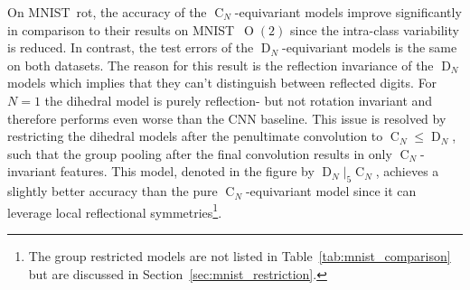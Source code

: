 \documentclass{article}
\renewcommand{\O}[1]{\ensuremath{\operatorname{O}(#1)}}
\newcommand{\DN}{\ensuremath{\operatorname{D}_{\!N}}}
\newcommand{\CN}{\ensuremath{\operatorname{C}_{\!N}}}
\begin{document}
On MNIST~rot, the accuracy of the $\CN$-equivariant models improve significantly in comparison to their results on MNIST~$\O2$ since the intra-class variability is reduced.
In contrast, the test errors of the $\DN$-equivariant models is the same on both datasets.
The reason for this result is the reflection invariance of the $\DN$ models which implies that they can't distinguish between reflected digits.
For $N=1$ the dihedral model is purely reflection- but not rotation invariant and therefore performs even worse than the CNN baseline.
This issue is resolved by restricting the dihedral models after the penultimate convolution to $\CN\leq\DN$, such that the group pooling after the final convolution results in only $\CN$-invariant features.
This model, denoted in the figure by $\DN\!|_5\!\CN$, achieves a slightly better accuracy than the pure $\CN$-equivariant model since it can leverage local reflectional symmetries\footnote{
    The group restricted models are not listed in Table~\ref{tab:mnist_comparison} but are discussed in Section~\ref{sec:mnist_restriction}.
}.
\end{document}
